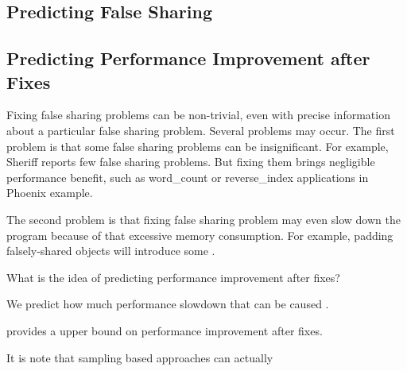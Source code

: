 

\subsection{Predicting False Sharing}

\subsection{Predicting Performance Improvement after Fixes}

\label{sec:predictimprove}

Fixing false sharing problems can be non-trivial, even with precise information about a particular false sharing problem. Several problems may occur. 
The first problem is that some false sharing problems can be insignificant. 
For example, Sheriff reports few false sharing problems. But fixing them brings negligible performance benefit, such as word\_count or reverse\_index applications in Phoenix example. 

The second problem is that fixing false sharing problem may even slow down the program because of that excessive memory consumption. For example, padding falsely-shared objects will introduce some . 

What is the idea of predicting performance improvement after fixes?  

We predict how much performance slowdown that can be caused . 

\cheetah{} provides a upper bound on performance improvement after fixes. 

It is note that sampling based approaches can actually 





